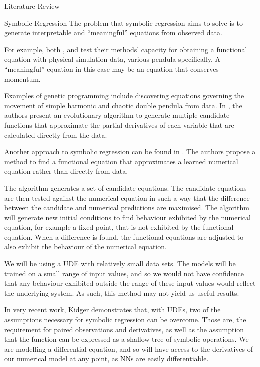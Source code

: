 \documentclass[12pt]{amsbook}
\begin{document}
\begin{chapter}{Literature Review}
\begin{section}{Symbolic Regression}
        The problem that symbolic regression aims to solve is to generate interpretable and ``meaningful'' equations from observed data. 
        
        For example, both \cite{schmidt2009distilling}, and \cite{bongard2007automated} test their methods' capacity for obtaining a functional equation with physical simulation data, various pendula specifically. A ``meaningful'' equation in this case may be an equation that conserves momentum.

        Examples of genetic programming include discovering equations governing the movement of simple harmonic and chaotic double pendula from data. In \cite{schmidt2009distilling}, the authors present an evolutionary algorithm to generate multiple candidate functions that approximate the partial derivatives of each variable that are calculated directly from the data. 
        
        Another approach to symbolic regression can be found in \cite{bongard2007automated}. The authors propose a method to find a functional equation that approximates a learned numerical equation rather than directly from data. 
        
        The algorithm generates a set of candidate equations. The candidate equations are then tested against the numerical equation in such a way that the difference between the candidate and numerical predictions are maximised. The algorithm will generate new initial conditions to find behaviour exhibited by the numerical equation, for example a fixed point, that is not exhibited by the functional equation. When a difference is found, the functional equations are adjusted to also exhibit the behaviour of the numerical equation. 
        
        We will be using a UDE with relatively small data sets. The models will be trained on a small range of input values, and so we would not have confidence that any behaviour exhibited outside the range of these input values would reflect the underlying system. As such, this method may not yield us useful results.
        
        In very recent work, Kidger\cite{kidger2022neural} demonstrates that, with UDEs, two of the assumptions necessary for symbolic regression can be overcome. Those are, the requirement for paired observations and derivatives, as well as the assumption that the function can be expressed as a shallow tree of symbolic operations. We are modelling a differential equation, and so will have access to the derivatives of our numerical model at any point, as NNs are easily differentiable. 


\end{section}
\end{chapter}
\end{document}
